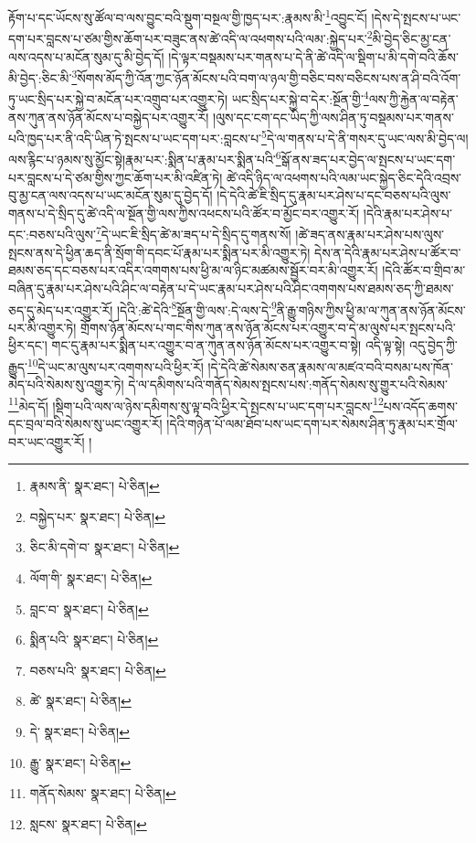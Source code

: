 རྟོག་པ་དང་ཡོངས་སུ་ཚོལ་བ་ལས་བྱུང་བའི་སྡུག་བསྔལ་གྱི་ཁྱད་པར་:རྣམས་མི་\footnote{རྣམས་ནི་  སྣར་ཐང་།  པེ་ཅིན། }འབྱུང་ངོ། །དེས་དེ་སྤངས་པ་ཡང་དག་པར་བླངས་པ་ཙམ་གྱིས་ཆོག་པར་བཟུང་ནས་ཚེ་འདི་ལ་འཕགས་པའི་ལམ་:སྐྱེད་པར་\footnote{བསྐྱེད་པར་  སྣར་ཐང་།  པེ་ཅིན། }མི་བྱེད་ཅིང་མྱ་ངན་ལས་འདས་པ་མངོན་སུམ་དུ་མི་བྱེད་དོ། །དེ་ལྟར་བསྡམས་པར་གནས་པ་དེ་ནི་ཚེ་འདི་ལ་སྡིག་པ་མི་དགེ་བའི་ཆོས་མི་བྱེད་:ཅིང་མི་\footnote{ཅིང་མི་དགེ་བ་  སྣར་ཐང་།  པེ་ཅིན། }སོགས་མོད་ཀྱི་འོན་ཀྱང་ཉོན་མོངས་པའི་བག་ལ་ཉལ་གྱི་བཅིང་བས་བཅིངས་པས་ན་ཤི་བའི་འོག་ཏུ་ཡང་སྲིད་པར་སྐྱེ་བ་མངོན་པར་འགྲུབ་པར་འགྱུར་ཏེ། ཡང་སྲིད་པར་སྐྱེ་བ་དེར་:སྔོན་གྱི་\footnote{ལོག་གི་  སྣར་ཐང་།  པེ་ཅིན། }ལས་ཀྱི་རྐྱེན་ལ་བརྟེན་ནས་ཀུན་ནས་ཉོན་མོངས་པ་བསྐྱེད་པར་འགྱུར་རོ། །ལུས་དང་ངག་དང་ཡིད་ཀྱི་ལས་ཤིན་ཏུ་བསྡམས་པར་གནས་པའི་ཁྱད་པར་ནི་འདི་ཡིན་ཏེ་སྤངས་པ་ཡང་དག་པར་:བླངས་པ་\footnote{བླང་བ་  སྣར་ཐང་།  པེ་ཅིན། }དེ་ལ་གནས་པ་དེ་ནི་གསར་དུ་ཡང་ལས་མི་བྱེད་ལ། ལས་རྙིང་པ་ཉམས་སུ་མྱོང་སྟེ།རྣམ་པར་:སྨིན་པ་རྣམ་པར་སྨིན་པའི་\footnote{སྨིན་པའི་  སྣར་ཐང་།  པེ་ཅིན། }སྒོ་ནས་ཟད་པར་བྱེད་ལ་སྤངས་པ་ཡང་དག་པར་བླངས་པ་དེ་ཙམ་གྱིས་ཀྱང་ཆོག་པར་མི་འཛིན་ཏེ། ཚེ་འདི་ཉིད་ལ་འཕགས་པའི་ལམ་ཡང་སྐྱེད་ཅིང་དེའི་འབྲས་བུ་མྱ་ངན་ལས་འདས་པ་ཡང་མངོན་སུམ་དུ་བྱེད་དོ། །དེ་དེའི་ཚེ་ཇི་སྲིད་དུ་རྣམ་པར་ཤེས་པ་དང་བཅས་པའི་ལུས་གནས་པ་དེ་སྲིད་དུ་ཚེ་འདི་ལ་སྔོན་གྱི་ལས་ཀྱིས་འཕངས་པའི་ཚོར་བ་མྱོང་བར་འགྱུར་རོ། །དེའི་རྣམ་པར་ཤེས་པ་དང་:བཅས་པའི་ལུས་\footnote{བཅས་པའི་  སྣར་ཐང་།  པེ་ཅིན། }དེ་ཡང་ཇི་སྲིད་ཚེ་མ་ཟད་པ་དེ་སྲིད་དུ་གནས་སོ། །ཚེ་ཟད་ནས་རྣམ་པར་ཤེས་པས་ལུས་སྤངས་ནས་དེ་ཕྱིན་ཆད་ནི་སྲོག་གི་དབང་པོ་རྣམ་པར་སྨིན་པར་མི་འགྱུར་ཏེ། དེས་ན་དེའི་རྣམ་པར་ཤེས་པ་ཚོར་བ་ཐམས་ཅད་དང་བཅས་པར་འདིར་འགགས་པས་ཕྱི་མ་ལ་ཉིང་མཚམས་སྦྱོར་བར་མི་འགྱུར་རོ། །དེའི་ཚོར་བ་གྲིབ་མ་བཞིན་དུ་རྣམ་པར་ཤེས་པའི་ཤིང་ལ་བརྟེན་པ་དེ་ཡང་རྣམ་པར་ཤེས་པའི་ཤིང་འགགས་པས་ཐམས་ཅད་ཀྱི་ཐམས་ཅད་དུ་མེད་པར་འགྱུར་རོ། །དེའི་:ཚེ་དེའི་\footnote{ཚེ་  སྣར་ཐང་།  པེ་ཅིན། }སྔོན་གྱི་ལས་:དེ་ལས་དེ་\footnote{དེ་  སྣར་ཐང་།  པེ་ཅིན། }ནི་རྒྱུ་གཉིས་ཀྱིས་ཕྱི་མ་ལ་ཀུན་ནས་ཉོན་མོངས་པར་མི་འགྱུར་ཏེ། གྲོགས་ཉོན་མོངས་པ་གང་གིས་ཀུན་ནས་ཉོན་མོངས་པར་འགྱུར་བ་དེ་མ་ལུས་པར་སྤངས་པའི་ཕྱིར་དང་། གང་དུ་རྣམ་པར་སྨིན་པར་འགྱུར་བ་ན་ཀུན་ནས་ཉོན་མོངས་པར་འགྱུར་བ་སྟེ། འདི་ལྟ་སྟེ། འདུ་བྱེད་ཀྱི་རྒྱུད་\footnote{རྒྱུ་  སྣར་ཐང་།  པེ་ཅིན། }དེ་ཡང་མ་ལུས་པར་འགགས་པའི་ཕྱིར་རོ། །དེ་དེའི་ཚེ་སེམས་ཅན་རྣམས་ལ་མཛའ་བའི་བསམ་པས་ཁོན་མེད་པའི་སེམས་སུ་འགྱུར་ཏེ། དེ་ལ་དམིགས་པའི་གནོད་སེམས་སྤངས་པས་:གནོད་སེམས་སུ་གྱུར་པའི་སེམས་\footnote{གནོད་སེམས་  སྣར་ཐང་།  པེ་ཅིན། }མེད་དོ། །སྡིག་པའི་ལས་ལ་ཉེས་དམིགས་སུ་ལྟ་བའི་ཕྱིར་དེ་སྤངས་པ་ཡང་དག་པར་བླངས་\footnote{སླངས་  སྣར་ཐང་།  པེ་ཅིན། }པས་འདོད་ཆགས་དང་བྲལ་བའི་སེམས་སུ་ཡང་འགྱུར་རོ། །དེའི་གཉེན་པོ་ལམ་ཐོབ་པས་ཡང་དག་པར་སེམས་ཤིན་ཏུ་རྣམ་པར་གྲོལ་བར་ཡང་འགྱུར་རོ། །

